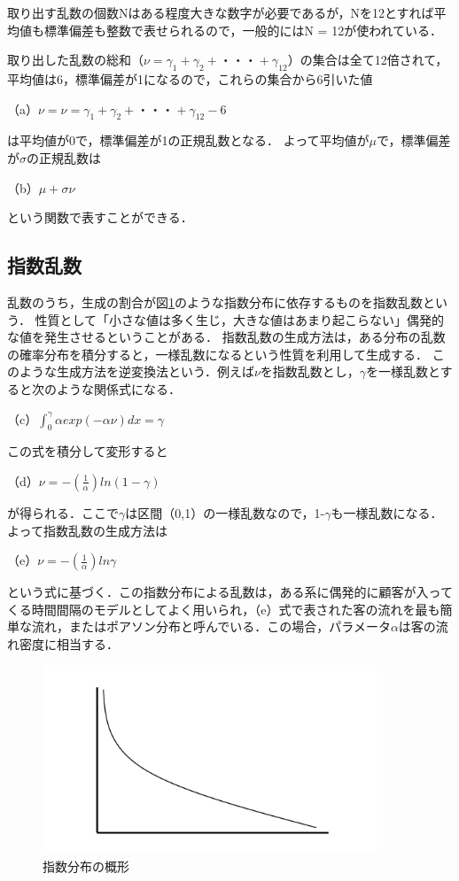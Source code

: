 \documentclass[12pt,a4j]{ltjsarticle}
\begin{document}
取り出す乱数の個数Nはある程度大きな数字が必要であるが，Nを12とすれば平均値も標準偏差も整数で表せられるので，一般的にはN = 12が使われている．

取り出した乱数の総和（$\nu=\gamma_1+\gamma_2+・・・+\gamma_{12}$）の集合は全て12倍されて，平均値は6，標準偏差が1になるので，これらの集合から6引いた値

（a）$\nu =  \nu=\gamma_1+\gamma_2+・・・+\gamma_{12}-6$

\noindent
は平均値が0で，標準偏差が1の正規乱数となる．
よって平均値が$\mu$で，標準偏差が$\sigma$の正規乱数は

（b）$\mu+\sigma\nu$

\noindent
という関数で表すことができる．

\clearpage

\subsection{指数乱数}
乱数のうち，生成の割合が図\ref{fig:sisuu}のような指数分布に依存するものを指数乱数という．
性質として「小さな値は多く生じ，大きな値はあまり起こらない」偶発的な値を発生させるということがある．
指数乱数の生成方法は，ある分布の乱数の確率分布を積分すると，一様乱数になるという性質を利用して生成する．
このような生成方法を逆変換法という．例えば$\nu$を指数乱数とし，$\gamma$を一様乱数とすると次のような関係式になる．

（c）$\int_0^\gamma{\alpha}exp(-\alpha\nu)dx = \gamma$

\noindent
この式を積分して変形すると

（d）$\nu = -(\frac{1}{\alpha})ln(1-\gamma)$

\noindent
が得られる．ここで$\gamma$は区間（0,1）の一様乱数なので，1-$\gamma$も一様乱数になる．よって指数乱数の生成方法は

（e）$\nu = -(\frac{1}{\alpha})ln\gamma$

\noindent
という式に基づく．この指数分布による乱数は，ある系に偶発的に顧客が入ってくる時間間隔のモデルとしてよく用いられ，（e）式で表された客の流れを最も簡単な流れ，またはポアソン分布と呼んでいる．この場合，パラメータ$\alpha$は客の流れ密度に相当する．

\begin{figure}[h]
\begin{center}
\includegraphics[width = 100mm ] {figures/sisuu.pdf}
\caption{指数分布の概形}
\end{center}
\label{fig:sisuu}
\end{figure}
\end{document}
